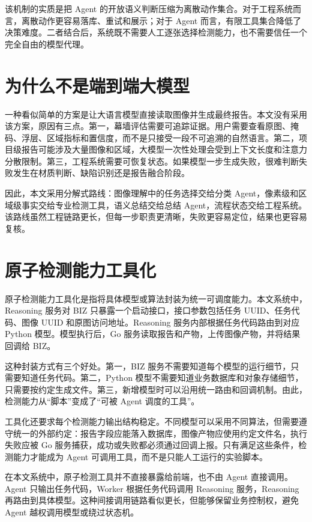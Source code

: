 该机制的实质是把 Agent 的开放语义判断压缩为离散动作集合。对于工程系统而言，离散动作更容易落库、重试和展示；对于 Agent 而言，有限工具集合降低了决策难度。二者结合后，系统既不需要人工逐张选择检测能力，也不需要信任一个完全自由的模型代理。

\section{为什么不是端到端大模型}
\label{sec:why-not-end-to-end-agent}

一种看似简单的方案是让大语言模型直接读取图像并生成最终报告。本文没有采用该方案，原因有三点。第一，幕墙评估需要可追踪证据。用户需要查看原图、掩码、浮层、区域指标和置信度，而不是只接受一段不可追溯的自然语言。第二，项目级报告可能涉及大量图像和区域，大模型一次性处理会受到上下文长度和注意力分散限制。第三，工程系统需要可恢复状态。如果模型一步生成失败，很难判断失败发生在材质判断、缺陷识别还是报告融合阶段。

因此，本文采用分解式路线：图像理解中的任务选择交给分类 Agent，像素级和区域级事实交给专业检测工具，语义总结交给总结 Agent，流程状态交给工程系统。该路线虽然工程链路更长，但每一步职责更清晰，失败更容易定位，结果也更容易复核。

\section{原子检测能力工具化}
\label{sec:atomic-tooling}

原子检测能力工具化是指将具体模型或算法封装为统一可调度能力。本文系统中，Reasoning 服务对 BIZ 只暴露一个启动接口，接口参数包括任务 UUID、任务代码、图像 UUID 和原图访问地址。Reasoning 服务内部根据任务代码路由到对应 Python 模型。模型执行后，Go 服务读取报告和产物，上传图像产物，并将结果回调给 BIZ。

这种封装方式有三个好处。第一，BIZ 服务不需要知道每个模型的运行细节，只需要知道任务代码。第二，Python 模型不需要知道业务数据库和对象存储细节，只需要按约定生成文件。第三，新增模型时可以沿用统一路由和回调机制。由此，检测能力从“脚本”变成了“可被 Agent 调度的工具”。

工具化还要求每个检测能力输出结构稳定。不同模型可以采用不同算法，但需要遵守统一的外部约定：报告字段应能落入数据库，图像产物应使用约定文件名，执行失败应被 Go 服务捕获，成功或失败都必须通过回调上报。只有满足这些条件，检测能力才能成为 Agent 可调用工具，而不是只能人工运行的实验脚本。

在本文系统中，原子检测工具并不直接暴露给前端，也不由 Agent 直接调用。Agent 只输出任务代码，Worker 根据任务代码调用 Reasoning 服务，Reasoning 再路由到具体模型。这种间接调用链路看似更长，但能够保留业务控制权，避免 Agent 越权调用模型或绕过状态机。


